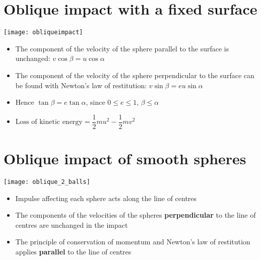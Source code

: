 \section{Oblique impact with a fixed surface}
\texttt{[image: obliqueimpact]}
\begin{itemize}
    \item The component of the velocity of the sphere parallel to the surface is unchanged: $v\cos\beta = u\cos\alpha$
    \item The component of the velocity of the sphere perpendicular to the surface can be found with Newton's law of restitution: $v\sin\beta = eu\sin\alpha$
    \item Hence $\tan\beta = e\tan\alpha$, since $0 \leq e \leq 1$, $\beta \leq \alpha$
    \item $\text{Loss of kinetic energy}=\dfrac{1}{2}mu^2-\dfrac{1}{2}mv^2$
\end{itemize}
\section{Oblique impact of smooth spheres}
\texttt{[image: oblique\_2\_balls]}
\begin{itemize}
    \item Impulse affecting each sphere acts along the line of centres
    \item The components of the velocities of the spheres \textbf{perpendicular}  to the line of centres are unchanged in the impact
    \item The principle of conservation of momentum and Newton's law of restitution applies \textbf{parallel} to the line of centres
\end{itemize}